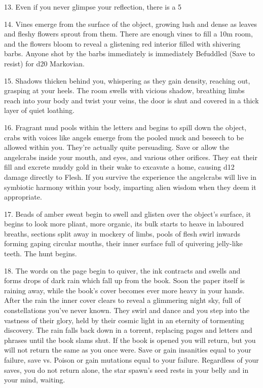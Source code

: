 13. Even if you never glimpse your reflection, there is a 5%



14. Vines emerge from the surface of the object, growing lush and dense as leaves and fleshy flowers sprout from them. There are enough vines to fill a 10m room, and the flowers bloom to reveal a glistening red interior filled with shivering barbs. Anyone shot by the barbs immediately is immediately Befuddled (Save to resist) for d20 Markovian.








15. Shadows thicken behind you, whispering as they gain density, reaching out, grasping at your heels. The room swells with vicious shadow, breathing limbs reach into your body and twist your veins, the door is shut and covered in a thick layer of quiet loathing.




16. Fragrant mud pools within the letters and begins to spill down the object, crabs with voices like angels emerge from the pooled muck and beseech to be allowed within you. They're actually quite persuading. Save or allow the angelcrabs inside your mouth, and eyes, and various other orifices. They eat their fill and excrete muddy gold in their wake to excavate a home, causing d12 damage directly to Flesh. If you survive the experience the angelcrabs will live in symbiotic harmony within your body, imparting alien wisdom when they deem it appropriate.



17. Beads of amber sweat begin to swell and glisten over the object's surface, it begins to look more pliant, more organic, its bulk starts to heave in laboured breaths, sections split away in mockery of limbs, pools of flesh swirl inwards forming gaping circular mouths, their inner surface full of quivering jelly-like teeth. The hunt begins.



18. The words on the page begin to quiver, the ink contracts and swells and forms drops of dark rain which fall up from the book. Soon the paper itself is raining away, while the book's cover becomes ever more heavy in your hands. After the rain the inner cover clears to reveal a glimmering night sky, full of constellations you've never known. They swirl and dance and you step into the vastness of their glory, held by their cosmic light in an eternity of tormenting discovery. The rain falls back down in a torrent, replacing pages and letters and phrases until the book slams shut. If the book is opened you will return, but you will not return the same as you once were. Save or gain insanities equal to your failure, save vs. Poison or gain mutations equal to your failure. Regardless of your saves, you do not return alone, the star spawn's seed rests in your belly and in your mind, waiting.



